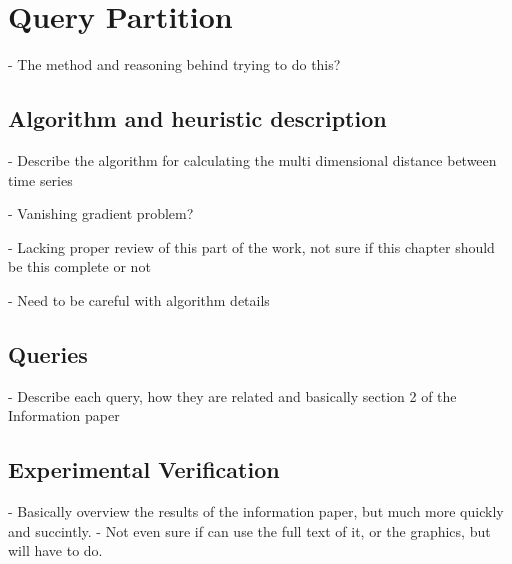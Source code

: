
\chapter{Query Partition}\label{ch:querypart}

- The method and reasoning behind trying to do this?

\section{Algorithm and heuristic description}\label{ch:querypart:heur}

- Describe the algorithm for calculating the multi dimensional distance between time series

- Vanishing gradient problem?

- Lacking proper review of this part of the work, not sure if this chapter should be this complete or not

- Need to be careful with algorithm details

\section{Queries}\label{ch:querypart:queries}

- Describe each query, how they are related and basically section 2 of the Information paper


\section{Experimental Verification}\label{ch:querypart:exp}

- Basically overview the results of the information paper, but much more quickly and succintly.
- Not even sure if can use the full text of it, or the graphics, but will have to do.
